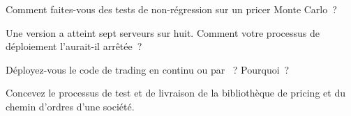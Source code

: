 \begin{interviewq}\label{iq:pl:testing-and-continuous-delivery:2}
Comment faites-vous des tests de non-régression sur un pricer Monte Carlo~?
\end{interviewq}

\begin{interviewq}\label{iq:pl:testing-and-continuous-delivery:3}
Une version a atteint sept serveurs sur huit. Comment votre processus de déploiement l'aurait-il arrêtée~?
\end{interviewq}

\begin{interviewq}\label{iq:pl:testing-and-continuous-delivery:4}
Déployez-vous le code de trading en continu ou par ~? Pourquoi~?
\end{interviewq}

\begin{interviewq}\label{iq:pl:testing-and-continuous-delivery:5}
Concevez le processus de test et de livraison de la bibliothèque de pricing et du chemin d'ordres d'une société.
\end{interviewq}
